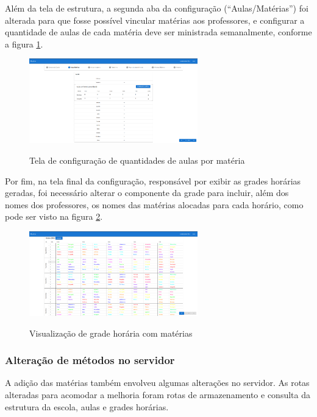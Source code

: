 Além da tela de estrutura, a segunda aba da configuração (``Aulas/Matérias'') foi alterada para que fosse possível vincular matérias aos professores, e configurar a quantidade de aulas de cada matéria deve ser ministrada semanalmente, conforme a figura \ref{fig:alteracaoAulas}.

\begin{figure}[h]
	\centering
	\caption{Tela de configuração de quantidades de aulas por matéria}
	\includegraphics[width=0.65\textwidth]{./dados/figuras/alteracaoAulas}
	\label{fig:alteracaoAulas}
\end{figure}

Por fim, na tela final da configuração, responsável por exibir as grades horárias geradas, foi necessário alterar o componente da grade para incluir, além dos nomes dos professores, os nomes das matérias alocadas para cada horário, como pode ser visto na figura \ref{fig:alteracaoHorario}.

\begin{figure}[h]
	\centering
	\caption{Visualização de grade horária com matérias}
	\includegraphics[width=0.65\textwidth]{./dados/figuras/alteracaoHorarios}
	\label{fig:alteracaoHorario}
\end{figure}

\newpage
\subsubsection{Alteração de métodos no servidor}
A adição das matérias também envolveu algumas alterações no servidor. As rotas alteradas para acomodar a melhoria foram rotas de armazenamento e consulta da estrutura da escola, aulas e grades horárias.

